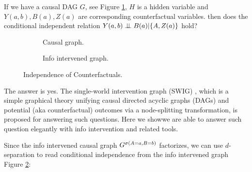 \begin{Eg}
	\label{eg:info_causal_DAG}
	If we have a causal DAG $G$, see Figure \ref{fig:indep1}, $H$ is a hidden variable and $Y(a, b), B(a), Z(a)$ are corresponding counterfactual variables. then does the conditional independent relation $Y(a, b) \perp\mkern-9.5mu\perp B(a) | \{A, Z(a)\}$ hold?
	
	\begin{figure}[ht]
		\begin{subfigure}[tb]{0.5\textwidth}
			\centering
			\caption{Causal graph.}
			\label{fig:indep1}
		\end{subfigure}
		\hfill
		\begin{subfigure}[tb]{0.5\textwidth}
			\centering
			\caption{Info intervened graph.}
			\label{fig:indep3}
		\end{subfigure}
		\caption{Independence of Counterfactuals.}
		\label{fig:indep}
	\end{figure}
\end{Eg}

The answer is yes. The single-world intervention graph (SWIG)  \cite{Richardson2011, richardson2013single}, which is a simple graphical theory unifying causal directed acyclic graphs (DAGs) and potential (aka counterfactual) outcomes via a node-splitting transformation, is proposed for answering such questions. Here we showwe are able to answer such question elegantly with info intervention and related tools.

Since the info intervened causal graph $G^{\mathrm{\sigma}(A=a, B=b)}$ factorizes, we can use $d$-separation to read conditional independence from the info intervened graph Figure \ref{fig:indep3}:

